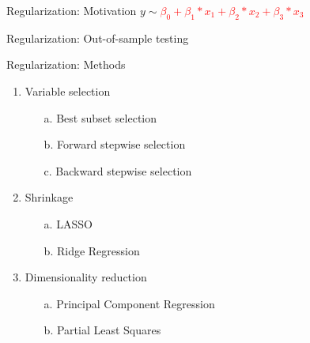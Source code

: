 \documentclass[8pt]{beamer}
\newcommand{\PythonInputNode}[6]{%
    \node[
        minimum width=#4,
        text width=#4,
        align=left,
        inner sep=0pt,
        outer sep=0pt,
        anchor=north west,
        label={[blue,
                anchor=north east,
                font=\ttfamily\fontsize{\the\numexpr#5-1\relax}{#5}\selectfont,
                inner sep=0pt,
                outer sep=0pt,
                xshift=-3pt,
                yshift=-3pt
                ]north west:In{[}#1{]}:},
    ] (#3) at #2 {
    \begin{lstlisting}[
        style=PythonInput,
        linewidth=#4,
        basicstyle=\ttfamily\fontsize{\the\numexpr#5-1\relax}{#5}\selectfont,
        numberstyle=\fontsize{\the\numexpr#5-1\relax}{#5}\selectfont\color[RGB]{128, 128, 128},
    ]^^J
        #6
    \end{lstlisting}
    };
}
\newcommand{\PythonOutputNode}[6]{%
    \node[
        minimum width=#4,
        text width=#4,
        align=left,
        inner sep=0pt,
        outer sep=0pt,
        anchor=north west,
        label={[red,
                anchor=north east,
                font=\ttfamily\fontsize{\the\numexpr#5-1\relax}{#5}\selectfont,
                inner sep=0pt,
                outer sep=0pt,
                xshift=-6pt,
                yshift=-11pt
                ]north west:Out{[}#1{]}:}
    ] (pythonoutput) (#3) at #2 {
        \begin{lstlisting}[
            style=PythonOutput,
            basicstyle=\ttfamily\fontsize{\the\numexpr#5-1\relax}{#5}\selectfont,
            numberstyle=\fontsize{\the\numexpr#5-1\relax}{#5}\selectfont\color[RGB]{128, 128, 128},
        ]^^J
            #6
        \end{lstlisting}
    };
}
\begin{document}
    \begin{frame}{Regularization: Motivation}
        \centering
        \vfill
        $y \sim$\textcolor{red} {$ \beta_0 + \beta_1 * x_1 + \beta_2 * x_2 + \beta_3 * x_3$}
        \vfill
    \end{frame}

    \begin{frame}{Regularization: Out-of-sample testing}
    \end{frame}

    \begin{frame}{Regularization: Methods}
        \begin{enumerate}
            \item Variable selection
            \begin{enumerate}
                \item[a.] Best subset selection
                \item[b.] Forward stepwise selection
                \item[c.] Backward stepwise selection
            \end{enumerate}
            \item Shrinkage
            \begin{enumerate}
                \item[a.] LASSO
                \item[b.] Ridge Regression
            \end{enumerate}
            \item Dimensionality reduction
            \begin{enumerate}
                \item[a.] Principal Component Regression
                \item[b.] Partial Least Squares
            \end{enumerate}
        \end{enumerate}
    \end{frame}
\end{document}
